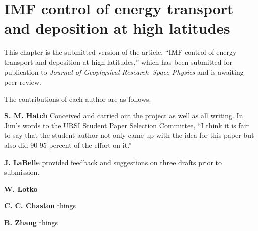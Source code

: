 
\chapter{IMF control of \Alfic energy transport and deposition at high latitudes}
\label{chp:4}

This chapter is the submitted version of the article, ``IMF control of
\Alfic energy transport and deposition at high latitudes,'' which has
been submitted for publication to \emph{Journal of Geophysical
  Research--Space Physics} and is awaiting peer review.

The contributions of each author are as follows:

\textbf{S. M. Hatch} Conceived and carried out the project as well as
all writing. In Jim's words to the URSI Student Paper Selection
Committee, ``I think it is fair to say that the student author not
only came up with the idea for this paper but also did 90-95 percent
of the effort on it.''

\textbf{J. LaBelle} provided feedback and suggestions on three drafts
prior to submission.

\textbf{W. Lotko} 

\textbf{C. C. Chaston} things

\textbf{B. Zhang} things



